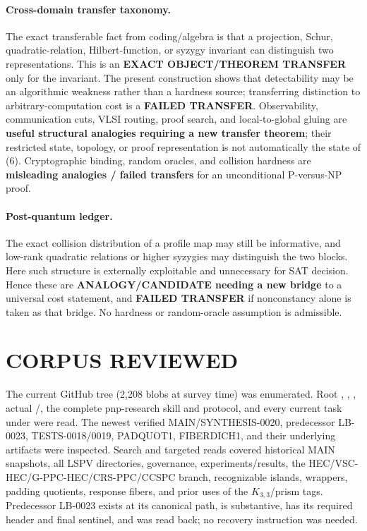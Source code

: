 \documentclass[11pt]{article}
\begin{document}
\paragraph{Cross-domain transfer taxonomy.}
The exact transferable fact from coding/algebra is that a projection, Schur,
quadratic-relation, Hilbert-function, or syzygy invariant can distinguish two
representations.  This is an \textbf{EXACT OBJECT/THEOREM TRANSFER} only for
the invariant.  The present construction shows that detectability may be an
algorithmic weakness rather than a hardness source; transferring distinction
to arbitrary-computation cost is a \textbf{FAILED TRANSFER}.  Observability,
communication cuts, VLSI routing, proof search, and local-to-global gluing are
\textbf{useful structural analogies requiring a new transfer theorem}; their
restricted state, topology, or proof representation is not automatically the
state of (6).  Cryptographic binding, random oracles, and collision hardness
are \textbf{misleading analogies / failed transfers} for an unconditional
P-versus-NP proof.

\paragraph{Post-quantum ledger.}
The exact collision distribution of a profile map may still be informative,
and low-rank quadratic relations or higher syzygies may distinguish the two
blocks.  Here such structure is externally exploitable and unnecessary for
SAT decision.  Hence these are \textbf{ANALOGY/CANDIDATE needing a new bridge}
to a universal cost statement, and \textbf{FAILED TRANSFER} if nonconstancy
alone is taken as that bridge.  No hardness or random-oracle assumption is
admissible.

\section{CORPUS REVIEWED}

The current GitHub tree (2,208 blobs at survey time) was enumerated.  Root
, , , actual
/, the complete pnp-research skill and
protocol, and every current task under  were read.  The newest
verified MAIN/SYNTHESIS-0020, predecessor LB-0023, TESTS-0018/0019,
PADQUOT1, FIBERDICH1, and their underlying artifacts were inspected.  Search
and targeted reads covered historical MAIN snapshots, all LSPV directories,
governance, experiments/results, the HEC/VSC-HEC/G-PPC-HEC/CRS-PPC/CCSPC
branch, recognizable islands, wrappers, padding quotients, response fibers,
and prior uses of the $K_{3,3}$/prism tags.  Predecessor LB-0023 exists at its
canonical path, is substantive, has its required header and final sentinel,
and was read back; no recovery instruction was needed.
\end{document}
